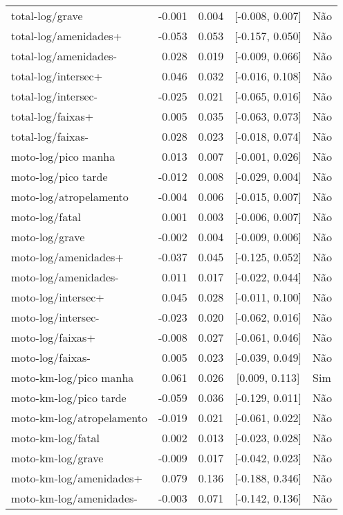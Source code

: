 \begin{longtable}{lrrcl}
total-log/grave & -0.001 & 0.004 & {}[-0.008, 0.007] & Não\\
total-log/amenidades+ & -0.053 & 0.053 & {}[-0.157, 0.050] & Não\\
total-log/amenidades- & 0.028 & 0.019 & {}[-0.009, 0.066] & Não\\
total-log/intersec+ & 0.046 & 0.032 & {}[-0.016, 0.108] & Não\\
total-log/intersec- & -0.025 & 0.021 & {}[-0.065, 0.016] & Não\\
total-log/faixas+ & 0.005 & 0.035 & {}[-0.063, 0.073] & Não\\
total-log/faixas- & 0.028 & 0.023 & {}[-0.018, 0.074] & Não\\
moto-log/pico manha & 0.013 & 0.007 & {}[-0.001, 0.026] & Não\\
moto-log/pico tarde & -0.012 & 0.008 & {}[-0.029, 0.004] & Não\\
moto-log/atropelamento & -0.004 & 0.006 & {}[-0.015, 0.007] & Não\\
moto-log/fatal & 0.001 & 0.003 & {}[-0.006, 0.007] & Não\\
moto-log/grave & -0.002 & 0.004 & {}[-0.009, 0.006] & Não\\
moto-log/amenidades+ & -0.037 & 0.045 & {}[-0.125, 0.052] & Não\\
moto-log/amenidades- & 0.011 & 0.017 & {}[-0.022, 0.044] & Não\\
moto-log/intersec+ & 0.045 & 0.028 & {}[-0.011, 0.100] & Não\\
moto-log/intersec- & -0.023 & 0.020 & {}[-0.062, 0.016] & Não\\
moto-log/faixas+ & -0.008 & 0.027 & {}[-0.061, 0.046] & Não\\
moto-log/faixas- & 0.005 & 0.023 & {}[-0.039, 0.049] & Não\\
moto-km-log/pico manha & 0.061 & 0.026 & {}[0.009, 0.113] & Sim\\
moto-km-log/pico tarde & -0.059 & 0.036 & {}[-0.129, 0.011] & Não\\
moto-km-log/atropelamento & -0.019 & 0.021 & {}[-0.061, 0.022] & Não\\
moto-km-log/fatal & 0.002 & 0.013 & {}[-0.023, 0.028] & Não\\
moto-km-log/grave & -0.009 & 0.017 & {}[-0.042, 0.023] & Não\\
moto-km-log/amenidades+ & 0.079 & 0.136 & {}[-0.188, 0.346] & Não\\
moto-km-log/amenidades- & -0.003 & 0.071 & {}[-0.142, 0.136] & Não\\

\end{longtable}
